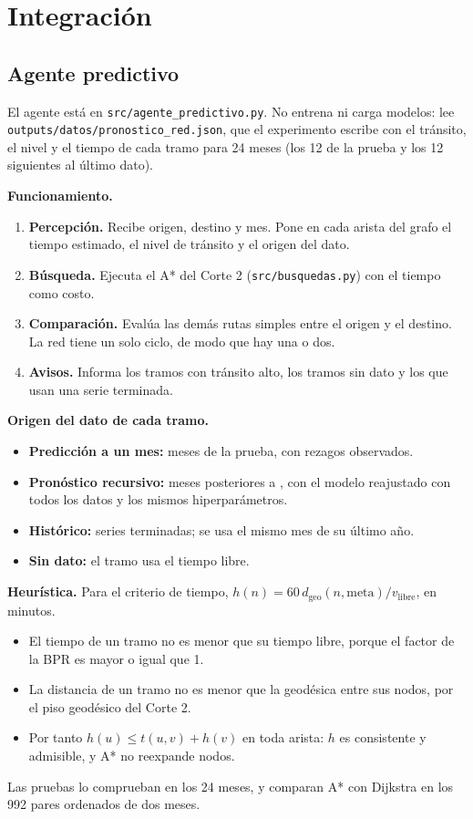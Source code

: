 \documentclass[12pt,a4paper]{article}
\begin{document}
\section{Integración}
\label{sec:integracion}

\subsection{Agente predictivo}

El agente está en \texttt{src/agente\_predictivo.py}. No entrena ni carga
modelos: lee \nolinkurl{outputs/datos/pronostico_red.json}, que el
experimento escribe con el tránsito, el nivel y el tiempo de cada tramo para
24 meses (los 12 de la prueba y los 12 siguientes al último dato).

\textbf{Funcionamiento.}
\begin{enumerate}
\item \textbf{Percepción.} Recibe origen, destino y mes. Pone en cada arista
del grafo el tiempo estimado, el nivel de tránsito y el origen del dato.
\item \textbf{Búsqueda.} Ejecuta el A* del Corte 2
(\texttt{src/busquedas.py}) con el tiempo como costo.
\item \textbf{Comparación.} Evalúa las demás rutas simples entre el origen y
el destino. La red tiene un solo ciclo, de modo que hay una o dos.
\item \textbf{Avisos.} Informa los tramos con tránsito alto, los tramos sin
dato y los que usan una serie terminada.
\end{enumerate}

\textbf{Origen del dato de cada tramo.}
\begin{itemize}
\item \textbf{Predicción a un mes:} meses de la prueba, con rezagos
observados.
\item \textbf{Pronóstico recursivo:} meses posteriores a \ctUltimoMes, con el
modelo reajustado con todos los datos y los mismos hiperparámetros.
\item \textbf{Histórico:} series terminadas; se usa el mismo mes de su último
año.
\item \textbf{Sin dato:} el tramo usa el tiempo libre.
\end{itemize}

\textbf{Heurística.} Para el criterio de tiempo,
$h(n) = 60\, d_{\text{geo}}(n, \text{meta}) / v_{\text{libre}}$, en minutos.
\begin{itemize}
\item El tiempo de un tramo no es menor que su tiempo libre, porque el factor
de la BPR es mayor o igual que 1.
\item La distancia de un tramo no es menor que la geodésica entre sus nodos,
por el piso geodésico del Corte 2.
\item Por tanto $h(u) \le t(u, v) + h(v)$ en toda arista: $h$ es consistente
y admisible, y A* no reexpande nodos.
\end{itemize}
Las pruebas lo comprueban en los 24 meses, y comparan A* con Dijkstra en los
992 pares ordenados de dos meses.
\end{document}
